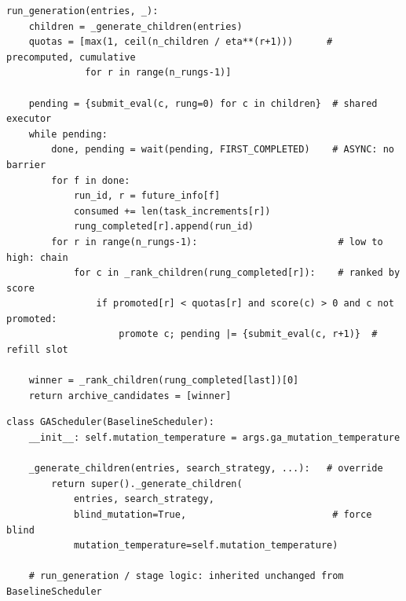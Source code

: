 \begin{lstlisting}[basicstyle=\ttfamily\footnotesize,columns=fullflexible,breaklines=true,caption={ASHA \texttt{run\_generation}: asynchronous promote-on-arrival with precomputed cumulative quotas.},label={lst:asha-pseudo}]
run_generation(entries, _):
    children = _generate_children(entries)
    quotas = [max(1, ceil(n_children / eta**(r+1)))      # precomputed, cumulative
              for r in range(n_rungs-1)]

    pending = {submit_eval(c, rung=0) for c in children}  # shared executor
    while pending:
        done, pending = wait(pending, FIRST_COMPLETED)    # ASYNC: no barrier
        for f in done:
            run_id, r = future_info[f]
            consumed += len(task_increments[r])
            rung_completed[r].append(run_id)
        for r in range(n_rungs-1):                         # low to high: chain
            for c in _rank_children(rung_completed[r]):    # ranked by score
                if promoted[r] < quotas[r] and score(c) > 0 and c not promoted:
                    promote c; pending |= {submit_eval(c, r+1)}  # refill slot

    winner = _rank_children(rung_completed[last])[0]
    return archive_candidates = [winner]
\end{lstlisting}

\begin{lstlisting}[basicstyle=\ttfamily\footnotesize,columns=fullflexible,breaklines=true,caption={GA scheduler: inherits Baseline staged evaluation, overrides only the mutation call.},label={lst:ga-pseudo}]
class GAScheduler(BaselineScheduler):
    __init__: self.mutation_temperature = args.ga_mutation_temperature

    _generate_children(entries, search_strategy, ...):   # override
        return super()._generate_children(
            entries, search_strategy,
            blind_mutation=True,                          # force blind
            mutation_temperature=self.mutation_temperature)

    # run_generation / stage logic: inherited unchanged from BaselineScheduler
\end{lstlisting}
